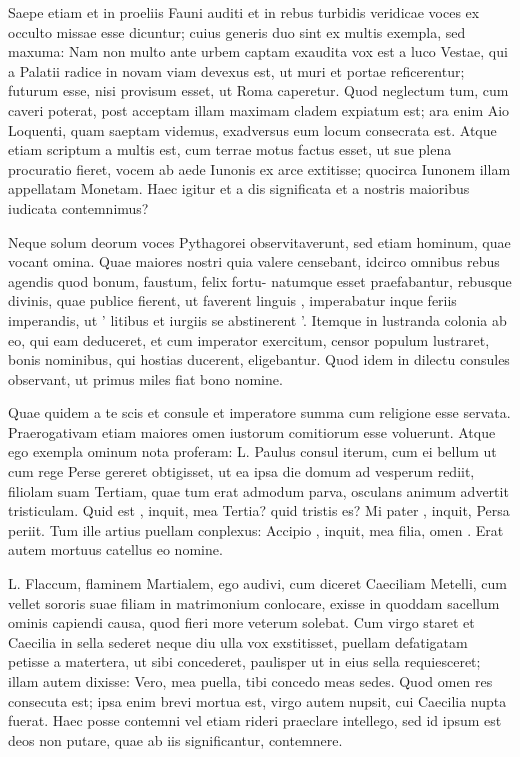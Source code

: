  Saepe etiam et in proeliis Fauni auditi et in rebus turbidis veridicae voces ex occulto missae esse dicuntur; cuius generis duo sint ex multis exempla, sed maxuma: Nam non multo ante urbem captam exaudita vox est a luco Vestae, qui a Palatii radice in novam viam devexus est, ut muri et portae reficerentur; futurum esse, nisi provisum esset, ut Roma caperetur. Quod neglectum tum, cum caveri poterat, post acceptam illam maximam cladem expiatum est; ara enim Aio Loquenti, quam saeptam videmus, exadversus eum locum consecrata est. Atque etiam scriptum a multis est, cum terrae motus factus esset, ut sue plena procuratio fieret, vocem ab aede Iunonis ex arce extitisse; quocirca Iunonem illam appellatam Monetam. Haec igitur et a dis significata et a nostris maioribus iudicata contemnimus?

 Neque solum deorum voces Pythagorei observitaverunt, sed etiam hominum, quae vocant omina. Quae maiores nostri quia valere censebant, idcirco omnibus rebus agendis quod bonum, faustum, felix fortu- natumque esset praefabantur, rebusque divinis, quae publice fierent, ut faverent linguis , imperabatur inque feriis imperandis, ut ' litibus et iurgiis se abstinerent '. Itemque in lustranda colonia ab eo, qui eam deduceret, et cum imperator exercitum, censor populum lustraret, bonis nominibus, qui hostias ducerent, eligebantur. Quod idem in dilectu consules observant, ut primus miles fiat bono nomine.

 Quae quidem a te scis et consule et imperatore summa cum religione esse servata. Praerogativam etiam maiores omen iustorum comitiorum esse voluerunt. Atque ego exempla ominum nota proferam: L. Paulus consul iterum, cum ei bellum ut cum rege Perse gereret obtigisset, ut ea ipsa die domum ad vesperum rediit, filiolam suam Tertiam, quae tum erat admodum parva, osculans animum advertit tristiculam. Quid est , inquit, mea Tertia? quid tristis es? Mi pater , inquit, Persa periit. Tum ille artius puellam conplexus: Accipio , inquit, mea filia, omen . Erat autem mortuus catellus eo nomine.

 L. Flaccum, flaminem Martialem, ego audivi, cum diceret Caeciliam Metelli, cum vellet sororis suae filiam in matrimonium conlocare, exisse in quoddam sacellum ominis capiendi causa, quod fieri more veterum solebat. Cum virgo staret et Caecilia in sella sederet neque diu ulla vox exstitisset, puellam defatigatam petisse a matertera, ut sibi concederet, paulisper ut in eius sella requiesceret; illam autem dixisse: Vero, mea puella, tibi concedo meas sedes. Quod omen res consecuta est; ipsa enim brevi mortua est, virgo autem nupsit, cui Caecilia nupta fuerat. Haec posse contemni vel etiam rideri praeclare intellego, sed id ipsum est deos non putare, quae ab iis significantur, contemnere.

